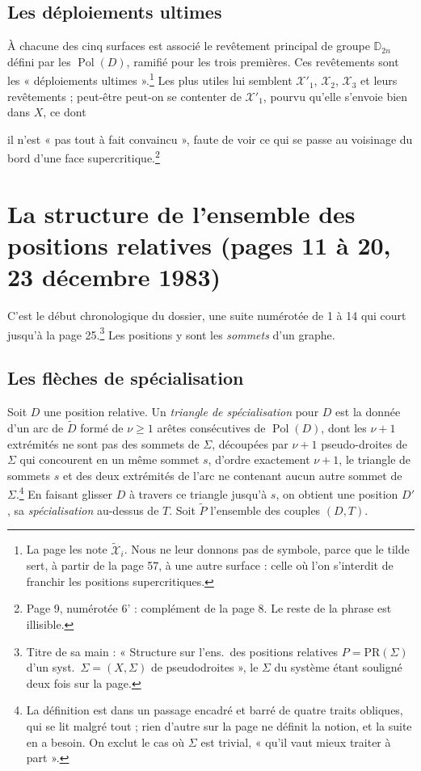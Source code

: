 \documentclass[11pt,a4paper]{article}
\begin{document}
\subsection*{Les déploiements ultimes}

À chacune des cinq surfaces est associé le revêtement principal de groupe
$\mathbb{D}_{2n}$ défini par les $\operatorname{Pol}(D)$, ramifié pour les
trois premières. Ces revêtements sont les « déploiements
ultimes ».\footnote{La page les note $\widetilde{\mathcal{X}}_i$. Nous ne leur
donnons pas de symbole, parce que le tilde sert, à partir de la page 57, à une
autre surface : celle où l'on s'interdit de franchir les positions
supercritiques.} Les plus utiles lui semblent $\mathcal{X}'_1$,
$\mathcal{X}_2$, $\mathcal{X}_3$ et leurs revêtements ; peut-être peut-on se
contenter de $\mathcal{X}'_1$, pourvu qu'elle s'envoie bien dans $X$, ce dont

il n'est « pas tout à fait convaincu », faute de voir ce qui se passe au
voisinage du bord d'une face supercritique.\footnote{Page 9, numérotée 6' :
complément de la page 8. Le reste de la phrase est illisible.}

\section*{La structure de l'ensemble des positions relatives (pages 11 à 20, 23 décembre 1983)}

C'est le début chronologique du dossier, une suite numérotée de 1 à 14 qui court
jusqu'à la page 25.\footnote{Titre de sa main : « Structure sur l'ens.\ des
positions relatives $P = \mathrm{PR}(\Sigma)$ d'un syst.\ $\Sigma = (X, \Sigma)$
de pseudodroites », le $\Sigma$ du système étant souligné deux fois sur la
page.} Les positions y sont les \emph{sommets} d'un graphe.

\subsection*{Les flèches de spécialisation}

Soit $D$ une position relative. Un \emph{triangle de spécialisation} pour $D$ est
la donnée d'un arc de $\widetilde{D}$ formé de $\nu \geqslant 1$ arêtes
consécutives de $\operatorname{Pol}(D)$, dont les $\nu + 1$ extrémités ne sont
pas des sommets de $\Sigma$, découpées par $\nu + 1$ pseudo-droites de $\Sigma$
qui concourent en un même sommet $s$, d'ordre exactement $\nu + 1$, le triangle
de sommets $s$ et des deux extrémités de l'arc ne contenant aucun autre sommet
de $\Sigma$.\footnote{La définition est dans un passage encadré et barré de
quatre traits obliques, qui se lit malgré tout ; rien d'autre sur la page ne
définit la notion, et la suite en a besoin. On exclut le cas où $\Sigma$ est
trivial, « qu'il vaut mieux traiter à part ».} En faisant glisser $D$ à travers
ce triangle jusqu'à $s$, on obtient une position $D'$, sa \emph{spécialisation}
au-dessus de $T$. Soit $\widetilde{P}$ l'ensemble des couples $(D, T)$.
\end{document}
